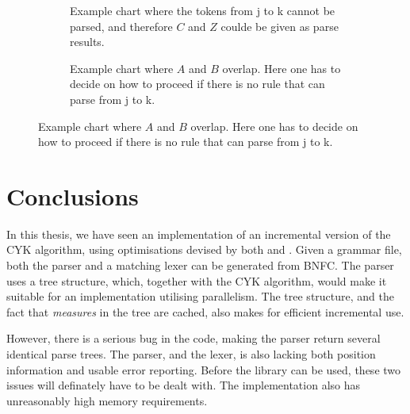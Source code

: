 \documentclass[a4paper,12pt,notitlepage]{report}
\newcommand{\subt}[3] { 
  \draw[grid] (#1,#1) -- (#1,#2) node[inChart] {#3} -- (#2,#2);
  \fill[color=black] (#1,#2) circle (2pt)
 }
\newcommand{\mrk}[2]{\node[inChart] at (#1,#1) {#2}}
\begin{document}
\begin{figure}[H]
  \centering
  \begin{subfigure}[H]{.4\textwidth}
    \flushleft
     \caption{\label{missingglue}Example chart where the tokens from j to k
     cannot be parsed, and therefore $C$ and $Z$ coulde be given as parse
     results.}
  \end{subfigure}
  \begin{subfigure}[H]{.1\textwidth}
  \text{}
  \end{subfigure}
  \begin{subfigure}[H]{.4\textwidth}
    \flushright
    \caption{\label{parseoverlap} Example chart where $A$ and $B$ overlap. Here one
    has to decide on how to proceed if there is no rule that can parse from j to
    k.}
  \end{subfigure}
\end{figure}

\section{Conclusions}
In this thesis, we have seen an implementation of an incremental version of the
CYK algorithm, using optimisations devised by both \citeauthor{Valiant75} and
\citeauthor{parparsepaper}. Given a grammar file, both the parser and a matching
lexer can be generated from BNFC. The parser uses a tree structure, which,
together with the CYK algorithm, would make it suitable for an implementation
utilising parallelism. The tree structure, and the fact that \textit{measures}
in the tree are cached, also makes for efficient incremental use.

However, there is a serious bug in the code, making the parser return several
identical parse trees. The parser, and the lexer, is also lacking both position
information and usable error reporting. Before the library can be used, these
two issues will definately have to be dealt with. The implementation also has
unreasonably high memory requirements.
\end{document}

